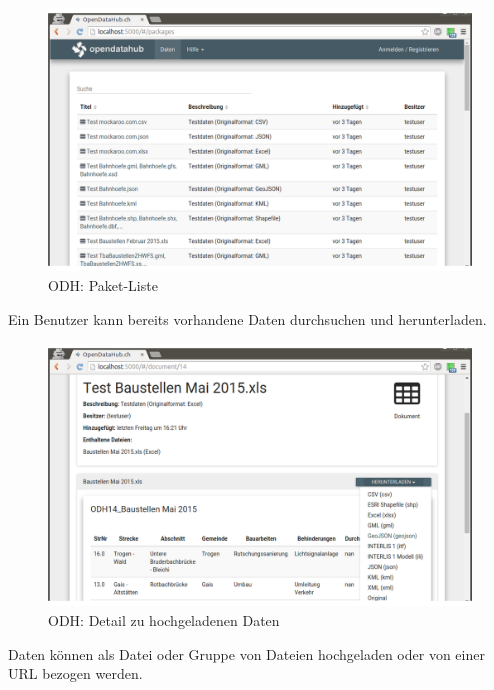 \begin{figure}[H]
    \centering
    \includegraphics[width=2\linewidth/3]{fig/odh-package-list}
    \caption{ODH: Paket-Liste}
\end{figure}

Ein Benutzer kann bereits vorhandene Daten durchsuchen und herunterladen. 

\begin{figure}[H]
    \centering
    \includegraphics[width=2\linewidth/3]{fig/odh-document-detail}
    \caption{ODH: Detail zu hochgeladenen Daten}
\end{figure}

Daten können als Datei oder Gruppe von Dateien hochgeladen oder von einer URL bezogen werden.

